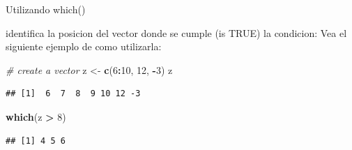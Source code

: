 \documentclass[ignorenonframetext,]{beamer}
\newenvironment{Shaded}{\begin{snugshade}}{\end{snugshade}}
\newcommand{\KeywordTok}[1]{\textcolor[rgb]{0.13,0.29,0.53}{\textbf{#1}}}
\newcommand{\DecValTok}[1]{\textcolor[rgb]{0.00,0.00,0.81}{#1}}
\newcommand{\StringTok}[1]{\textcolor[rgb]{0.31,0.60,0.02}{#1}}
\newcommand{\CommentTok}[1]{\textcolor[rgb]{0.56,0.35,0.01}{\textit{#1}}}
\newcommand{\OperatorTok}[1]{\textcolor[rgb]{0.81,0.36,0.00}{\textbf{#1}}}
\newcommand{\NormalTok}[1]{#1}
\begin{document}
\begin{frame}[fragile]{Utilizando which()}

identifica la posicion del vector donde se cumple (is TRUE) la
condicion: Vea el siguiente ejemplo de como utilizarla:

\begin{Shaded}
\begin{Highlighting}[]
\CommentTok{# create a vector}
\NormalTok{z <-}\StringTok{ }\KeywordTok{c}\NormalTok{(}\DecValTok{6}\OperatorTok{:}\DecValTok{10}\NormalTok{, }\DecValTok{12}\NormalTok{, }\OperatorTok{-}\DecValTok{3}\NormalTok{)}
\NormalTok{z}
\end{Highlighting}
\end{Shaded}

\begin{verbatim}
## [1]  6  7  8  9 10 12 -3
\end{verbatim}

\begin{Shaded}
\begin{Highlighting}[]
\KeywordTok{which}\NormalTok{(z }\OperatorTok{>}\StringTok{ }\DecValTok{8}\NormalTok{)}
\end{Highlighting}
\end{Shaded}

\begin{verbatim}
## [1] 4 5 6
\end{verbatim}

\end{frame}
\end{document}
